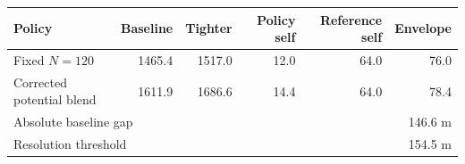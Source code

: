 \begin{tabular}{@{}lrrrrr@{}}
\toprule
Policy & Baseline & Tighter & Policy self & Reference self & Envelope \\
\midrule
Fixed $N=120$ &
1465.4 &
1517.0 &
12.0 &
64.0 &
76.0 \\
Corrected potential blend &
1611.9 &
1686.6 &
14.4 &
64.0 &
78.4 \\
\midrule
\multicolumn{3}{l}{Absolute baseline gap} &
\multicolumn{3}{r}{146.6 m} \\
\multicolumn{3}{l}{Resolution threshold} &
\multicolumn{3}{r}{154.5 m} \\
\bottomrule
\end{tabular}
